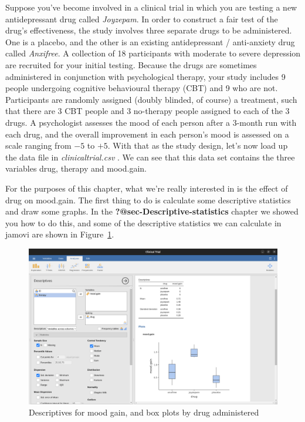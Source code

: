 \documentclass[
  a4paper,
]{book}
\begin{document}
Suppose you've become involved in a clinical trial in which you are
testing a new antidepressant drug called \emph{Joyzepam}. In order to
construct a fair test of the drug's effectiveness, the study involves
three separate drugs to be administered. One is a placebo, and the other
is an existing antidepressant / anti-anxiety drug called
\emph{Anxifree}. A collection of 18 participants with moderate to severe
depression are recruited for your initial testing. Because the drugs are
sometimes administered in conjunction with psychological therapy, your
study includes 9 people undergoing cognitive behavioural therapy (CBT)
and 9 who are not. Participants are randomly assigned (doubly blinded,
of course) a treatment, such that there are 3 CBT people and 3
no-therapy people assigned to each of the 3 drugs. A psychologist
assesses the mood of each person after a 3-month run with each drug, and
the overall improvement in each person's mood is assessed on a scale
ranging from \(-5\) to \(+5\). With that as the study design, let's now
load up the data file in \emph{clinicaltrial.csv} . We can see that this
data set contains the three variables drug, therapy and mood.gain.

For the purposes of this chapter, what we're really interested in is the
effect of drug on mood.gain. The first thing to do is calculate some
descriptive statistics and draw some graphs. In the
\textbf{?@sec-Descriptive-statistics} chapter we showed you how to do
this, and some of the descriptive statistics we can calculate in jamovi
are shown in Figure~\ref{fig-fig13-1}.

\begin{figure}

\includegraphics[width=1\textwidth,height=\textheight]{images/fig13-1.png} \hfill{}

\caption{\label{fig-fig13-1}Descriptives for mood gain, and box plots by
drug administered}

\end{figure}
\end{document}
